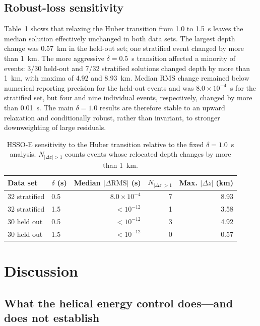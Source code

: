 \documentclass[10pt]{article}
\begin{document}
\subsection{Robust-loss sensitivity}

Table~\ref{tab:huber} shows that relaxing the Huber transition from 1.0 to 1.5~s leaves the median solution effectively unchanged in both data sets. The largest depth change was 0.57~km in the held-out set; one stratified event changed by more than 1~km. The more aggressive $\delta=0.5$~s transition affected a minority of events: 3/30 held-out and 7/32 stratified solutions changed depth by more than 1~km, with maxima of 4.92 and 8.93~km. Median RMS change remained below numerical reporting precision for the held-out events and was $8.0\times10^{-4}$~s for the stratified set, but four and nine individual events, respectively, changed by more than 0.01~s. The main $\delta=1.0$ results are therefore stable to an upward relaxation and conditionally robust, rather than invariant, to stronger downweighting of large residuals.

\begin{table}[H]
\centering\small
\caption{HSSO-E sensitivity to the Huber transition relative to the fixed $\delta=1.0$~s analysis. $N_{|\Delta z|>1}$ counts events whose relocated depth changes by more than 1~km.}
\label{tab:huber}
\begin{tabular}{llrrr}
\toprule
Data set & $\delta$ (s) & Median $|\Delta\mathrm{RMS}|$ (s) & $N_{|\Delta z|>1}$ & Max. $|\Delta z|$ (km)\\
\midrule
32 stratified & 0.5 & $8.0\times10^{-4}$ & 7 & 8.93\\
32 stratified & 1.5 & $<10^{-12}$ & 1 & 3.58\\
30 held out & 0.5 & $<10^{-12}$ & 3 & 4.92\\
30 held out & 1.5 & $<10^{-12}$ & 0 & 0.57\\
\bottomrule
\end{tabular}
\end{table}

\section{Discussion}

\subsection{What the helical energy control does---and does not establish}
\end{document}
